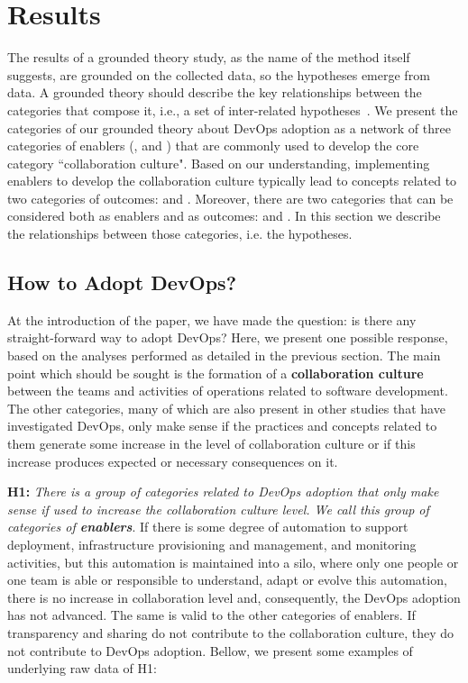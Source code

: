 \section{Results} \label{sec:results}

The results of a grounded theory study, as the name of the method itself
suggests, are grounded on the collected data, so the hypotheses emerge from
data. A grounded theory should describe the key relationships between the
categories that compose it, i.e., a set of inter-related hypotheses~\cite{hoda2017becoming}.
We present the categories of our grounded theory
about DevOps adoption as a network of three categories of enablers (,
 and ) that are commonly used to develop the core category
``collaboration culture". Based on our understanding, implementing enablers to develop the collaboration
culture typically lead to concepts related to two categories of outcomes:
 and . Moreover, there are two categories that can be considered
both as enablers and as outcomes:  and .
In this section we describe the relationships between those categories, i.e.
the hypotheses.

\subsection{How to Adopt DevOps?}
At the introduction of the paper, we have made the question: is there any
straight-forward way to adopt DevOps? Here, we present one possible response,
based on the analyses performed as detailed in the previous section. The main
point which should be sought is the formation of a \textbf{collaboration
culture} between the teams and activities of operations related to software
development. The other categories, many of which are also present in other
studies that have investigated DevOps, only make sense if the practices and
concepts related to them generate some increase in the level of collaboration
culture or if this increase produces expected or necessary consequences on it.

\textbf{H1:} \textit{There is a group of categories related to DevOps adoption
that only make sense if used to increase the collaboration culture level. We
call this group of categories of \textbf{enablers}}. If there is some degree of
automation to support deployment, infrastructure provisioning and management,
and monitoring activities, but this automation is maintained into a silo, where
only one people or one team is able or responsible to understand, adapt or
evolve this automation, there is no increase in collaboration level and,
consequently, the DevOps adoption has not advanced. The same is valid to the
other categories of enablers. If transparency and sharing do not contribute to
the collaboration culture, they do not contribute to DevOps adoption. Bellow,
we present some examples of underlying raw data of H1:

